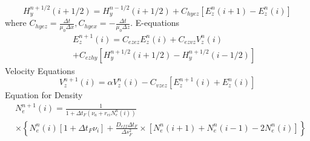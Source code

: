 \documentclass[a4paper,10pt]{article}
\begin{document}
\begin{equation}
H_{y}^{n+1/2}(i+1/2)=H_{y}^{n-1/2}(i+1/2) +C_{hyez}\left[E_{z}^{n}(i+1)-E_{z}^{n}(i)\right] 
\end{equation}
where $C_{hyez}=\frac{\Delta t}{\mu_{0}\Delta x},C_{hyex}=-\frac{\Delta t}{\mu_{0}\Delta z}$.\newline
E-equations
\begin{eqnarray}
&& E_{z}^{n+1}(i)=C_{ezez} E_{z}^{n}(i)+C_{ezvz} V_{z}^{n}(i)\nonumber\\
&& +C_{ezhy}\left[H_{y}^{n+1/2}(i+1/2)-H_{y}^{n+1/2}(i-1/2)\right]
\end{eqnarray}
Velocity Equations
\begin{equation}
V_{z}^{n+1}(i)=\alpha V_{z}^{n}(i)-C_{vzez}\left[E_{z}^{n+1}(i)+E_{z}^{n}(i)\right]
\end{equation}
Equation for Density
\begin{equation}
\begin{aligned}
& N^{n+1}_{e}(i)=\frac{1}{1+\Delta t_{F}(\nu_{a}+r_{ei}N^{n}_{e}(i))} \\
& \times \left\lbrace N^{n}_{e}(i)\left[1+\Delta t_{F} \nu_{i}\right]+\frac{D_{eff}\Delta t_{F}}{\Delta s^{2}_{F}}  \times 
 \left[ N^{n}_{e}(i+1)+N^{n}_{e}(i-1)-2N^{n}_{e}(i)\right]
\right\rbrace \\
\end{aligned}
\end{equation}
\end{document}
